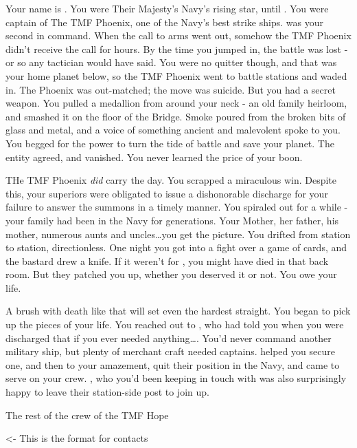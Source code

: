 \documentclass[char]{TMFHope}
\begin{document}
\name{\cCap{}}

Your name is \cCap{}. You were Their Majesty's Navy's rising star, until \pBattle{}. You were captain of The TMF Phoenix, one of the Navy's best strike ships. \cXO{} was your second in command. When the call to arms went out, somehow the TMF Phoenix didn't receive the call for hours. By the time you jumped in, the battle was lost - or so any tactician would have said. You were no quitter though, and that was your home planet below, so the TMF Phoenix went to battle stations and waded in. The Phoenix was out-matched; the move was suicide. But you had a secret weapon. You pulled a medallion from around your neck - an old family heirloom, and smashed it on the floor of the Bridge. Smoke poured from the broken bits of glass and metal, and a voice of something ancient and malevolent spoke to you. You begged for the power to turn the tide of battle and save your planet. The entity agreed, and vanished. You never learned the price of your boon.

THe TMF Phoenix \emph{did} carry the day. You scrapped a miraculous win. Despite this, your superiors were obligated to issue a dishonorable discharge for your failure to answer the summons in a timely manner. You spiraled out for a while - your family had been in the Navy for generations. Your Mother, her father, his mother, numerous aunts and uncles\ldots you get the picture. You drifted from station to station, directionless. One night you got into a fight over a game of cards, and the bastard drew a knife. If it weren't for \cMed{}, you might have died in that back room. But they patched you up, whether you deserved it or not. You owe \cMed{} your life.

A brush with death like that will set even the hardest \cCap{\human} straight. You began to pick up the pieces of your life. You reached out to \cXO{}, who had told you when you were discharged that if you ever needed anything\ldots. You'd never command another military ship, but plenty of merchant craft needed captains. \cXO{} helped you secure one, and then to your amazement, quit their position in the Navy, and came to serve on your crew. \cMed{}, who you'd been keeping in touch with was also surprisingly happy to leave their station-side post to join up.

The rest of the crew of the TMF Hope

\begin{itemz}[Goals]
	\item 
\end{itemz}

\begin{itemz}[Notes]
	\item 
\end{itemz}

\begin{contacts}
	\contact{\cTest{}} <- This is the format for contacts 
\end{contacts}
\end{document}
